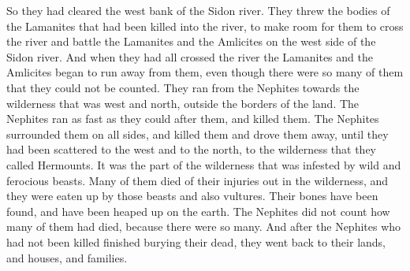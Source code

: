 So they had cleared the west bank of the Sidon river. They threw the bodies of the Lamanites that had been killed into the river, to make room for them to cross the river and battle the Lamanites and the Amlicites on the west side of the Sidon river.
\bverse \iffalse And it came to pass that when they had all crossed the river Sidon that the Lamanites and the Amlicites began to flee before them, notwithstanding they were so numerous that they could not be numbered. \fi
And when they had all crossed the river the Lamanites and the Amlicites began to run away from them, even though there were so many of them that they could not be counted.
\bverse \iffalse And they fled before the Nephites towards the wilderness which was west and north, away beyond the borders of the land; and the Nephites did pursue them with their might, and did slay them. \fi
They ran from the Nephites towards the wilderness that was west and north, outside the borders of the land. The Nephites ran as fast as they could after them, and killed them.
\bverse \iffalse Yea, they were met on every hand, and slain and driven, until they were scattered on the west, and on the north, until they had reached the wilderness, which was called Hermounts; and it was that part of the wilderness which was infested by wild and ravenous beasts. \fi
The Nephites surrounded them on all sides, and killed them and drove them away, until they had been scattered to the west and to the north, to the wilderness that they called Hermounts. It was the part of the wilderness that was infested by wild and ferocious beasts.
\bverse \iffalse And it came to pass that many died in the wilderness of their wounds, and were devoured by those beasts and also the vultures of the air; and their bones have been found, and have been heaped up on the earth. \fi
Many of them died of their injuries out in the wilderness, and they were eaten up by those beasts and also vultures. Their bones have been found, and have been heaped up on the earth.
\bchapter
\bverse \iffalse And it came to pass that the Nephites who were not slain by the weapons of war, after having buried those who had been slain--now the number of the slain were not numbered, because of the greatness of their number--after they had finished burying their dead they all returned to their lands, and to their houses, and their wives, and their children. \fi
The Nephites did not count how many of them had died, because there were so many. And after the Nephites who had not been killed finished burying their dead, they went back to their lands, and houses, and families.
